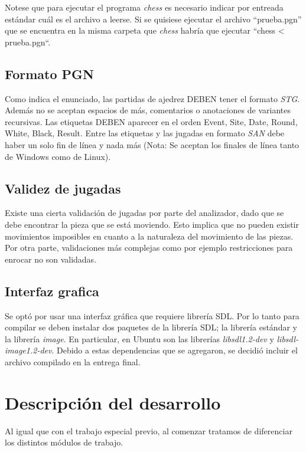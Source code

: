 \documentclass[a4paper,10pt]{article}
\begin{document}
Notese que para ejecutar el programa \textit{chess} es necesario indicar por entreada estándar cuál es el archivo a leerse. Si se 
quisiese ejecutar el archivo ``prueba.pgn'' que se encuentra en la misma carpeta que \textit{chess} habría que ejecutar ``chess < 
prueba.pgn``.

\subsection{Formato PGN}

Como indica el enunciado, las partidas de ajedrez DEBEN tener el formato \textit{STG}. Además no se aceptan espacios de más, comentarios 
o anotaciones de variantes recursivas. Las etiquetas DEBEN aparecer en el orden Event, Site, Date, Round, White, Black, Result.
 Entre las etiquetas y las jugadas en formato \textit{SAN} debe haber un solo fin de línea y nada más (Nota: Se aceptan los finales de línea 
tanto de Windows como de Linux).

\subsection{ Validez de jugadas}

Existe una cierta validación de jugadas por parte del analizador, dado que se debe encontrar la pieza que se está moviendo. Esto implica que 
no pueden existir movimientos imposibles en cuanto a la naturaleza del movimiento de las piezas. Por otra parte, validaciones más complejas como 
por ejemplo restricciones para enrocar no son validadas.

\subsection{ Interfaz grafica}

Se optó por usar una interfaz gráfica que requiere librería SDL. Por lo tanto para compilar se deben instalar dos paquetes de la librería SDL; la librería 
estándar y la librería \textit{image}. En particular, en Ubuntu son las librerías \textit{libsdl1.2-dev} y \textit{libsdl-image1.2-dev}. Debido a estas 
dependencias que se agregaron, se decidió incluir el archivo compilado en la entrega final.

\newpage

\section{Descripción del desarrollo}
  Al igual que con el trabajo especial previo, al comenzar tratamos de diferenciar los distintos módulos de trabajo. 
\end{document}
